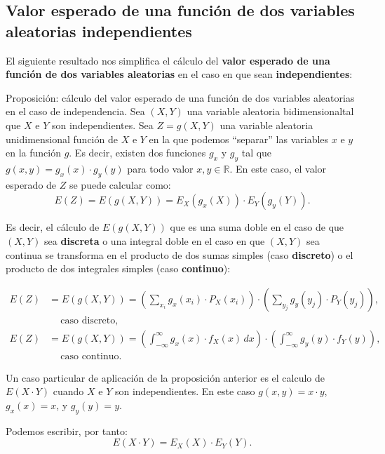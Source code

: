 \documentclass[
  letterpaper,
  DIV=11,
  numbers=noendperiod]{scrreprt}
\begin{document}
\hypertarget{valor-esperado-de-una-funciuxf3n-de-dos-variables-aleatorias-independientes}{%
\subsection{Valor esperado de una función de dos variables aleatorias
independientes}\label{valor-esperado-de-una-funciuxf3n-de-dos-variables-aleatorias-independientes}}

El siguiente resultado nos simplifica el cálculo del \textbf{valor
esperado de una función de dos variables aleatorias} en el caso en que
sean \textbf{independientes}:

Proposición: cálculo del valor esperado de una función de dos variables
aleatorias en el caso de independencia. Sea \((X,Y)\) una variable
aleatoria bidimensionaltal que \(X\) e \(Y\) son independientes. Sea
\(Z=g(X,Y)\) una variable aleatoria unidimensional función de \(X\) e
\(Y\) en la que podemos ``separar'' las variables \(x\) e \(y\) en la
función \(g\). Es decir, existen dos funciones \(g_x\) y \(g_y\) tal que
\(g(x,y)=g_x(x)\cdot g_y(y)\) para todo valor \(x,y\in\mathbb{R}\). En
este caso, el valor esperado de \(Z\) se puede calcular como: \[
E(Z)=E(g(X,Y))=E_X(g_x(X))\cdot E_Y(g_y(Y)).
\]

Es decir, el cálculo de \(E(g(X,Y))\) que es una suma doble en el caso
de que \((X,Y)\) sea \textbf{discreta} o una integral doble en el caso
en que \((X,Y)\) sea continua se transforma en el producto de dos sumas
simples (caso \textbf{discreto}) o el producto de dos integrales simples
(caso \textbf{continuo}):

\[
\begin{array}{rl}
E(Z) & =E(g(X,Y))=\displaystyle\left(\sum_{x_i} g_x(x_i)\cdot P_X(x_i)\right)\cdot \left(\sum_{y_j} g_y(y_j)\cdot P_Y(y_j)\right),\\ &\ \quad \mbox{caso discreto},\\
E(Z) & =E(g(X,Y))=\displaystyle\left(\int_{-\infty}^\infty g_x(x)\cdot f_X(x)\, dx\right)\cdot \left(\int_{-\infty}^\infty g_y(y)\cdot f_Y(y)\right), \\  &\ \quad \mbox{caso continuo}.
\end{array}
\]

Un caso particular de aplicación de la proposición anterior es el
calculo de \(E(X\cdot Y)\) cuando \(X\) e \(Y\) son independientes. En
este caso \(g(x,y)=x\cdot y\), \(g_x(x)=x\), y \(g_y(y)=y\).

Podemos escribir, por tanto: \[
E(X\cdot Y)=E_X(X)\cdot E_Y(Y).
\]
\end{document}
